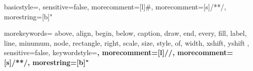 

{
  basicstyle=\normalsize\ttfamily, %
  sensitive=false, %
  morecomment=[l]{\#}, %
  morecomment=[s]{/*}{*/}, %
  morestring=[b]" %
}

{
  morekeywords={
	above,
	align,
  	begin,
	below,
  	caption,
	draw,
	end,
	every,
	fill,
	label,
  	line,
	minumum,
	node,
	rectangle,
	right,
	scale,
	size,
  	style,
	of,
  	width,
  	xshift,
  	yshift
  },
  sensitive=false, %
  keywordstyle=\color{THIblue}\bfseries,
  morecomment=[l]{//}, %
  morecomment=[s]{/*}{*/}, %
  morestring=[b]" %
}
